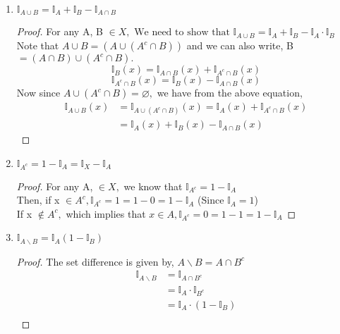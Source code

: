 \documentclass[letterpaper, 12pt]{article}
\newcommand{\1}{\mathds{1}}	%
\theoremstyle{definition}
\begin{document}
{\begin{enumerate}
\begin{proof}
\begin{align*}
            &\Longleftrightarrow \mathds{I}_{A} \cdot \mathds{I}_{B} = 0.
        \end{align*}
        Thus, $\mathds{I}_{A \cap B} = \mathds{I}_{A} \cdot \mathds{I}_{B}$
    \end{proof}
    \item $\mathds{I}_{A \cup B} = \mathds{I}_{A} + \mathds{I}_{B} - \mathds{I}_{A \cap B}$
    \begin{proof}
        For any A, B $\in X, \text{ We need to show that } \mathds{I}_{A \cup B} = \mathds{I}_{A} + \mathds{I}_{B} - \mathds{I}_{A}\cdot \mathds{I}_{B}$ \\
        Note that $A \cup B = (A \cup (A^c \cap B))$ and we can also write, B $= (A \cap B) \cup (A^c \cap B).$ 
        \[\mathds{I}_{B}(x) = \mathds{I}_{A \cap B} (x) + \mathds{I}_{A^c \cap B} (x)\]
        \[\mathds{I}_{A^c \cap B} (x) = \mathds{I}_{B}(x) - \mathds{I}_{A \cap B} (x)\]
        Now since $A \cup (A^c \cap B) = \varnothing,$ we have from the above equation,
        \begin{align*}
            \mathds{I}_{A \cup B} (x) &= \mathds{I}_{A \cup (A^c \cap B)}(x) = \mathds{I}_{A}(x) + \mathds{I}_{A^c \cap B}(x) \\
            &= \mathds{I}_{A}(x) + \mathds{I}_{B}(x) - \mathds{I}_{A \cap B}(x)
        \end{align*}
    \end{proof}
    \item $\mathds{I}_{A^c} = 1 - \mathds{I}_{A} = \mathds{I}_{X} - \mathds{I}_{A}$
    \begin{proof}
        For any A, $\in X,$ we know that $\mathds{I}_{A^c} = 1 - \mathds{I}_{A}$\\
        Then, if x $\in A^c, \mathds{I}_{A^c} = 1 = 1 - 0 = 1 - \mathds{I}_{A}$ (Since $\mathds{I}_A = 1$) \\
        If x $\notin A^c,$ which implies that $x \in A, \mathds{I}_{A^c} = 0 = 1 - 1 = 1 - \mathds{I}_{A}$
    \end{proof}
    \item $\mathds{I}_{A \backslash B} = \mathds{I}_{A} (1 - \mathds{I}_{B})$
    \begin{proof}
        The set difference is given by, $A \backslash B = A \cap B^c$
        \begin{align*}
            \mathds{I}_{A \backslash B} &= \mathds{I}_{A \cap B^c} \\
            &= \mathds{I}_{A} \cdot \mathds{I}_{B^c} \\
            &= \mathds{I}_{A} \cdot (1 - \mathds{I}_{B}) \\

\end{align*}
\end{proof}
\end{enumerate}}
\end{document}
